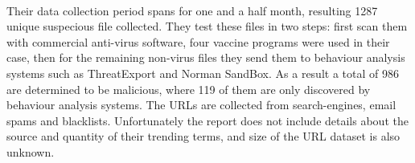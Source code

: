 \paragraph{}
Their data collection period spans for one and a half month, resulting 1287 
unique suspecious file collected. They test these files in two steps: first 
scan them with commercial anti-virus software, four vaccine programs were used 
in their case,  then for the remaining non-virus files they send them to 
behaviour analysis systems such as ThreatExport and Norman SandBox. As a result 
a total of 986 are determined to be malicious, where 119 of them are only 
discovered by behaviour analysis systems. 
The URLs are collected from search-engines, email spams and blacklists. 
Unfortunately the report does not include details about the source and 
quantity of their trending terms, and size of the URL dataset is also unknown. 

